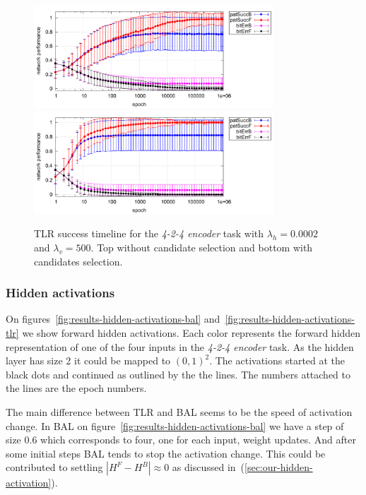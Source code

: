 \begin{figure}[H]
  \centering
  \includegraphics[width=0.8\textwidth]{img/tlr-auto4-best-perf.pdf}\\
  \includegraphics[width=0.8\textwidth]{img/tlr-auto4-best-can.pdf}      
  \caption{TLR success timeline for the \emph{4-2-4 encoder} task with $\lambda_h=0.0002$ and $\lambda_v=500$. Top without candidate selection and bottom with candidates selection.}
  \label{fig:results-tlr-auto4-epoch} 
\end{figure}

\subsubsection{Hidden activations} 
\label{sec:tlr-auto4-hidden}

On figures~\ref{fig:results-hidden-activations-bal} and~\ref{fig:results-hidden-activations-tlr} we show forward hidden activations. Each color represents the forward hidden representation of one of the four inputs in the \emph{4-2-4 encoder} task. As the hidden layer has size 2 it could be mapped to $(0,1)^2$. The activations started at the black dots and continued as outlined by the the lines. The numbers attached to the lines are the epoch numbers. 

The main difference between TLR and BAL seems to be the speed of activation change. In BAL on figure~\ref{fig:results-hidden-activations-bal} we have a step of size 0.6 which corresponds to four, one for each input, weight updates. And after some initial steps BAL tends to stop the activation change. This could be contributed to settling $|H^F-H^B| \approx 0$ as discussed in~(\ref{sec:our-hidden-activation}). 

